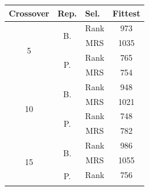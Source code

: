 \documentclass[10pt,a4paper,openbib]{article}
\begin{document}
\begin{multicols}{2}
\begin{table}[H]
\centering
\begin{tabular}{|c|c|c|c|}
\hline
\multicolumn{1}{|l|}{\textbf{Crossover}} & \multicolumn{1}{l|}{\textbf{Rep.}} & \multicolumn{1}{l|}{\textbf{Sel.}} & \multicolumn{1}{l|}{\textbf{Fittest}} \\ \hline
\multirow{4}{*}{5}                       & \multirow{2}{*}{B.}                & Rank                               & 973                                   \\ \cline{3-4} 
                                         &                                    & MRS                                & 1035                                  \\ \cline{2-4} 
                                         & \multirow{2}{*}{P.}                & Rank                               & 765                                   \\ \cline{3-4} 
                                         &                                    & MRS                                & 754                                   \\ \hline
\multirow{4}{*}{10}                      & \multirow{2}{*}{B.}                & Rank                               & 948                                   \\ \cline{3-4} 
                                         &                                    & MRS                                & 1021                                  \\ \cline{2-4} 
                                         & \multirow{2}{*}{P.}                & Rank                               & 748                                   \\ \cline{3-4} 
                                         &                                    & MRS                                & 782                                   \\ \hline
\multirow{4}{*}{15}                      & \multirow{2}{*}{B.}                & Rank                               & 986                                   \\ \cline{3-4} 
                                         &                                    & MRS                                & 1055                                  \\ \cline{2-4} 
                                         & \multirow{2}{*}{P.}                & Rank                               & 756                                   \\ \cline{3-4} 

\end{tabular}
\end{table}
\end{multicols}
\end{document}
